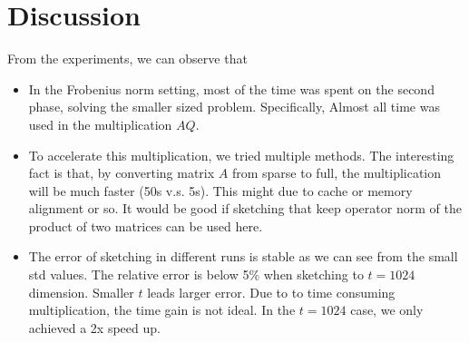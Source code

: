 \section{Discussion}

From the experiments,
we can observe that
\begin{itemize}
    \item In the Frobenius norm setting,
        most of the time was spent on the second phase,
        \ie solving the smaller sized problem.
        Specifically,
        Almost all time was used in the multiplication $AQ$.
    \item To accelerate this multiplication,
        we tried multiple methods.
        The interesting fact is that,
        by converting matrix $A$ from sparse to full,
        the multiplication will be much faster
        (50s v.s. 5s).
        This might due to cache or memory alignment or so.
        It would be good if sketching
        that keep operator norm of the product of two matrices
        can be used here.
    \item The error of sketching in different runs is stable
        as we can see from the small std values.
        The relative error is below 5\% when sketching to
        $t=1024$ dimension.
        Smaller $t$ leads larger error.
        Due to to time consuming multiplication,
        the time gain is not ideal.
        In the $t=1024$ case,
        we only achieved a 2x speed up.
\end{itemize}
